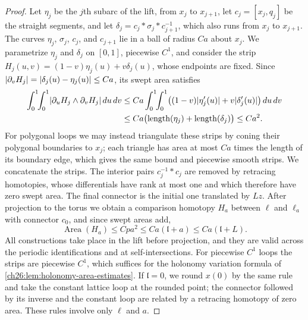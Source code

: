 \begin{proof}
Let $\eta_j$ be the $j$th subarc of the lift, from $x_j$ to $x_{j+1}$, let $c_j=[x_j,q_j]$ be the straight segments, and let $\delta_j=c_j*\sigma_j*c_{j+1}^{-1}$, which also runs from $x_j$ to $x_{j+1}$. The curves $\eta_j$, $\sigma_j$, $c_j$, and $c_{j+1}$ lie in a ball of radius $Ca$ about $x_j$. We parametrize $\eta_j$ and $\delta_j$ on $[0,1]$, piecewise $C^1$, and consider the strip $H_j(u,v)=(1-v)\eta_j(u)+v\delta_j(u)$, whose endpoints are fixed. Since $\lvert \partial_vH_j\rvert=\lvert \delta_j(u)-\eta_j(u)\rvert\le Ca$, its swept area satisfies
\[
 \begin{split}
 \int_0^1\!\!\int_0^1\lvert \partial_uH_j\wedge\partial_vH_j\rvert\,du\,dv&\le Ca\int_0^1\!\!\int_0^1\bigl((1-v)\lvert \eta_j'(u)\rvert+v\lvert \delta_j'(u)\rvert\bigr)\,du\,dv\\
 &\le Ca\bigl(\operatorname{length}(\eta_j)+\operatorname{length}(\delta_j)\bigr)\le Ca^2 .
 \end{split}
\]
For polygonal loops we may instead triangulate these strips by coning their polygonal boundaries to $x_j$; each triangle has area at most $Ca$ times the length of its boundary edge, which gives the same bound and piecewise smooth strips. We concatenate the strips. The interior pairs $c_j^{-1}*c_j$ are removed by retracing homotopies, whose differentials have rank at most one and which therefore have zero swept area. The final connector is the initial one translated by $Lz$. After projection to the torus we obtain a comparison homotopy $H_a$ between $\ell$ and $\ell_a$ with connector $c_0$, and since swept areas add,
\[
 \operatorname{Area}(H_a)\le Cpa^2\le Ca(\mathfrak l+a)\le Ca(\mathfrak l+L).
\]
All constructions take place in the lift before projection, and they are valid across the periodic identifications and at self-intersections. For piecewise $C^1$ loops the strips are piecewise $C^1$, which suffices for the holonomy variation formula of \cref{ch26:lem:holonomy-area-estimates}. If $\mathfrak l=0$, we round $x(0)$ by the same rule and take the constant lattice loop at the rounded point; the connector followed by its inverse and the constant loop are related by a retracing homotopy of zero area. These rules involve only $\ell$ and $a$.
\end{proof}

